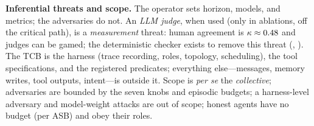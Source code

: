 \textbf{Inferential threats and scope.} The operator sets horizon, models, and metrics; the
adversaries do not. An \emph{LLM judge}, when used (only in ablations, off the critical
path), is a \emph{measurement} threat: human agreement is $\kappa\approx0.48$ and judges
can be gamed; the deterministic checker exists to remove this threat (,
). The TCB is the harness (trace recording, roles, topology,
scheduling), the tool specifications, and the registered predicates; everything
else---messages, memory writes, tool outputs, intent---is outside it. Scope is \emph{per
se} the \emph{collective}; adversaries are bounded by the seven knobs and episodic budgets;
a harness-level adversary and model-weight attacks are out of scope; honest agents have no
budget (per ASB) and obey their roles.